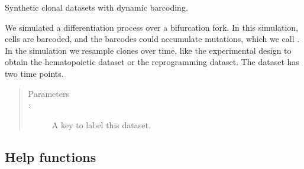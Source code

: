 \documentclass[letterpaper,10pt,english]{sphinxmanual}
\begin{document}
\begin{fulllineitems}
\label{\detokenize{cospar.datasets.synthetic_bifurcation_dynamic_BC:cospar.datasets.synthetic_bifurcation_dynamic_BC}}
Synthetic clonal datasets with dynamic barcoding.

We simulated a differentiation process over a bifurcation fork. In this simulation,
cells are barcoded, and the barcodes could accumulate mutations, which we call
. In the simulation we resample clones over time,
like the experimental design to obtain the hematopoietic dataset
or the reprogramming dataset. The dataset has two time points.
\begin{quote}\begin{description}
\item[{Parameters}] \leavevmode\item[{ : }] \leavevmode
A key to label this dataset.


\end{description}\end{quote}

\end{fulllineitems}



\subsection{Help functions}
\label{\detokenize{api:help-functions}}
\end{document}
